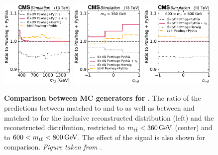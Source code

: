 \begin{figure}[!t]
    \centering
    \includegraphics[width=0.32\textwidth]{figures/ah/altbgs/generators_mtt_cms.pdf}
    \hfill
    \includegraphics[width=0.32\textwidth]{figures/ah/altbgs/generators_chel_lowmtt_cms.pdf}
    \hfill
    \includegraphics[width=0.32\textwidth]{figures/ah/altbgs/generators_chel_highmtt_cms.pdf}
    \caption{
        \textbf{Comparison between MC generators for \tttWsum.} The ratio of the predictions between \powheg \hvq \ttbar matched to \herwig and to \pythia as well as between \bbfourl and \tttWsum matched to \pythia for the inclusive reconstructed \mtt distribution (left) and the reconstructed \chel distribution, restricted to $\mtt < \SI{360}{\GeV}$ (center) and to $600 < \mtt < \SI{800}{\GeV}$. The effect of the \etat signal is also shown for comparison. \textit{Figure taken from .}
    }
    \label{fig:ah:herwigbb4l}
\end{figure}

